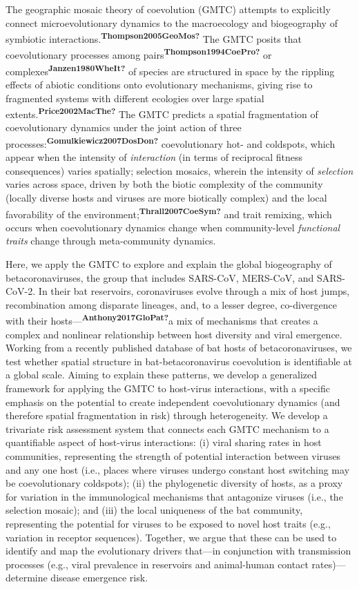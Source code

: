 \documentclass[10pt,oneside]{article}
\begin{document}
The geographic mosaic theory of coevolution (GMTC) attempts to
explicitly connect microevolutionary dynamics to the macroecology and
biogeography of symbiotic
interactions.\textsuperscript{\textbf{Thompson2005GeoMos?}} The GMTC
posits that coevolutionary processes among
pairs\textsuperscript{\textbf{Thompson1994CoePro?}} or
complexes\textsuperscript{\textbf{Janzen1980WheIt?}} of species are
structured in space by the rippling effects of abiotic conditions onto
evolutionary mechanisms, giving rise to fragmented systems with
different ecologies over large spatial
extents.\textsuperscript{\textbf{Price2002MacThe?}} The GMTC predicts a
spatial fragmentation of coevolutionary dynamics under the joint action
of three processes:\textsuperscript{\textbf{Gomulkiewicz2007DosDon?}}
coevolutionary hot- and coldspots, which appear when the intensity of
\emph{interaction} (in terms of reciprocal fitness consequences) varies
spatially; selection mosaics, wherein the intensity of \emph{selection}
varies across space, driven by both the biotic complexity of the
community (locally diverse hosts and viruses are more biotically
complex) and the local favorability of the
environment;\textsuperscript{\textbf{Thrall2007CoeSym?}} and trait
remixing, which occurs when coevolutionary dynamics change when
community-level \emph{functional traits} change through meta-community
dynamics.

Here, we apply the GMTC to explore and explain the global biogeography
of betacoronaviruses, the group that includes SARS-CoV, MERS-CoV, and
SARS-CoV-2. In their bat reservoirs, coronaviruses evolve through a mix
of host jumps, recombination among disparate lineages, and, to a lesser
degree, co-divergence with their
hosts---\textsuperscript{\textbf{Anthony2017GloPat?}}a mix of mechanisms
that creates a complex and nonlinear relationship between host diversity
and viral emergence. Working from a recently published database of bat
hosts of betacoronaviruses, we test whether spatial structure in
bat-betacoronavirus coevolution is identifiable at a global scale.
Aiming to explain these patterns, we develop a generalized framework for
applying the GMTC to host-virus interactions, with a specific emphasis
on the potential to create independent coevolutionary dynamics (and
therefore spatial fragmentation in risk) through heterogeneity. We
develop a trivariate risk assessment system that connects each GMTC
mechanism to a quantifiable aspect of host-virus interactions: (i) viral
sharing rates in host communities, representing the strength of
potential interaction between viruses and any one host (i.e., places
where viruses undergo constant host switching may be coevolutionary
coldspots); (ii) the phylogenetic diversity of hosts, as a proxy for
variation in the immunological mechanisms that antagonize viruses (i.e.,
the selection mosaic); and (iii) the local uniqueness of the bat
community, representing the potential for viruses to be exposed to novel
host traits (e.g., variation in receptor sequences). Together, we argue
that these can be used to identify and map the evolutionary drivers
that---in conjunction with transmission processes (e.g., viral
prevalence in reservoirs and animal-human contact rates)--- determine
disease emergence risk.
\end{document}
